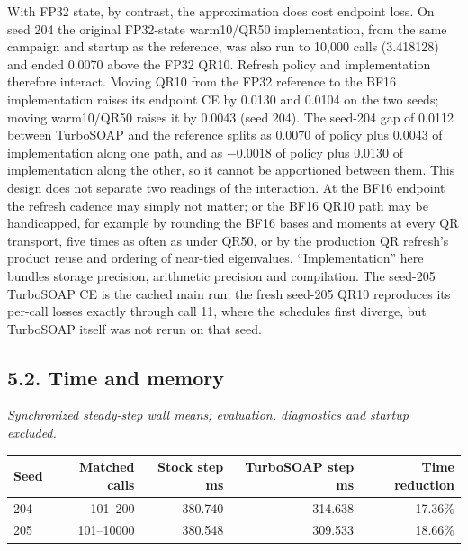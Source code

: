 With FP32 state, by contrast, the approximation does cost endpoint
loss. On seed 204 the original FP32-state warm10/QR50 implementation,
from the same campaign and startup as the reference, was also run to
10,000 calls (3.418128) and ended 0.0070 above the FP32 QR10. Refresh
policy and implementation therefore interact. Moving QR10 from the FP32
reference to the BF16 implementation raises its endpoint CE by 0.0130
and 0.0104 on the two seeds; moving warm10/QR50 raises it by 0.0043
(seed 204). The seed-204 gap of 0.0112 between TurboSOAP and the
reference splits as 0.0070 of policy plus 0.0043 of implementation
along one path, and as $-0.0018$ of policy plus 0.0130 of
implementation along the other, so it cannot be apportioned between
them. This design does not separate two readings of the interaction.
At the BF16 endpoint the refresh
cadence may simply not matter; or the BF16 QR10 path may be
handicapped, for example by rounding the BF16 bases and moments at
every QR transport, five times as often as under QR50, or by the
production QR refresh's product reuse and ordering of near-tied
eigenvalues. ``Implementation'' here bundles storage precision,
arithmetic precision and compilation. The seed-205 TurboSOAP CE is the
cached main run: the fresh seed-205 QR10 reproduces its per-call losses
exactly through call 11, where the schedules first diverge, but
TurboSOAP itself was not rerun on that seed.

\hypertarget{time-and-memory}{%
\subsection{5.2. Time and memory}\label{time-and-memory}}

\begin{minipage}{\linewidth}

\emph{Synchronized steady-step wall means; evaluation, diagnostics and
startup excluded.}

\begin{center}
\begin{tabular}{@{}lrrrr@{}}
\toprule\noalign{}
Seed & Matched calls & Stock step ms & TurboSOAP step ms & Time reduction \\
\midrule\noalign{}
204 & 101--200 & 380.740 & 314.638 & 17.36\% \\
205 & 101--10000 & 380.548 & 309.533 & 18.66\% \\
\bottomrule
\end{tabular}
\end{center}

\end{minipage}

